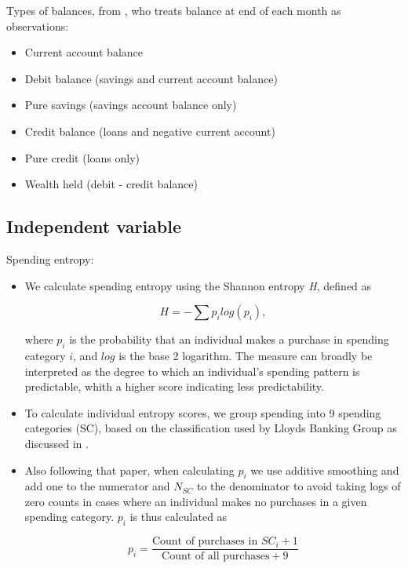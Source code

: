 Types of balances, from \citet{becker2017does}, who treats balance at end of
each month as observations:

\begin{itemize}
    \item Current account balance
    \item Debit balance (savings and current account balance)
    \item Pure savings (savings account balance only)
    \item Credit balance (loans and negative current account)
    \item Pure credit (loans only)
    \item Wealth held (debit - credit balance)
\end{itemize}


\subsection{Independent variable}%
\label{sub:independent_variable}

Spending entropy:

\begin{itemize}

    \item We calculate spending entropy using the Shannon entropy
        \textit{H}\citep{shannon1948mathematical}, defined as

        \begin{equation}
            H = -\sum{p_i}log(p_i),
        \end{equation}

    where $p_i$ is the probability that an individual makes a purchase in
    spending category $i$, and $log$ is the base 2 logarithm. The measure can
    broadly be interpreted as the degree to which an individual's spending
    pattern is predictable, whith a higher score indicating less
    predictability.

    \item To calculate individual entropy scores, we group spending into 9
        spending categories (SC), based on the classification used by Lloyds
        Banking Group as discussed in \citet{muggleton2020evidence}.

    \item Also following that paper, when calculating $p_i$ we use additive
        smoothing and add one to the numerator and $N_{SC}$ to the denominator
        to avoid taking logs of zero counts in cases where an individual makes
        no purchases in a given spending category. $p_i$ is thus calculated as

        \begin{equation}
            p_i = \frac{\text{Count of purchases in $SC_i$} + 1}{\text{Count of
            all purchases} + 9}
        \end{equation}

\end{itemize}

